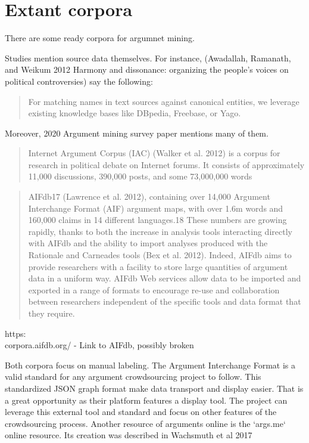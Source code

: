 \documentclass{report}
\begin{document}
\section{Extant corpora}
There are some ready corpora for argumnet mining.

Studies mention source data themselves. 
For instance, (Awadallah, Ramanath, and Weikum 2012 Harmony and dissonance: organizing the people's voices on political controversies)
say the following:
\begin{quote}
 For matching names in text sources against canonical entities, we leverage existing knowledge bases like DBpedia, Freebase, or Yago.
\end{quote}

Moreover, 2020 Argument mining survey paper \cite{lawrence_argument_2020} mentions many of them.

\begin{quote}
 Internet Argument Corpus (IAC) (Walker et al. 2012) is a corpus for research in political debate on Internet forums. It consists of approximately 11,000 discussions, 390,000 posts, and some 73,000,000 words
\end{quote}
\begin{quote}
 AIFdb17 (Lawrence et al. 2012), containing over 14,000 Argument Interchange Format (AIF) argument maps, with over 1.6m words and 160,000 claims in 14 different languages.18 These numbers are growing rapidly, thanks to both the increase in analysis tools interacting directly with AIFdb and the ability to import analyses produced with the Rationale and Carneades tools (Bex et al. 2012). Indeed, AIFdb aims to provide researchers with a facility to store large quantities of argument data in a uniform way. AIFdb Web services allow data to be imported and exported in a range of formats to encourage re-use and collaboration between researchers independent of the specific tools and data format that they require.
\end{quote}
https:\\corpora.aifdb.org/ - Link to AIFdb, possibly broken

Both corpora focus on manual labeling.
The Argument Interchange Format is a valid standard for any argument crowdsourcing project to follow.  This standardized JSON graph format make data transport and display easier. That is a great opportunity as their platform features a display tool.  The project can leverage this external tool and standard and focus on other features of the crowdsourcing process.
Another resource of arguments online is the `args.me` online resource. 
Its creation was described in Wachsmuth et al 2017
\end{document}
